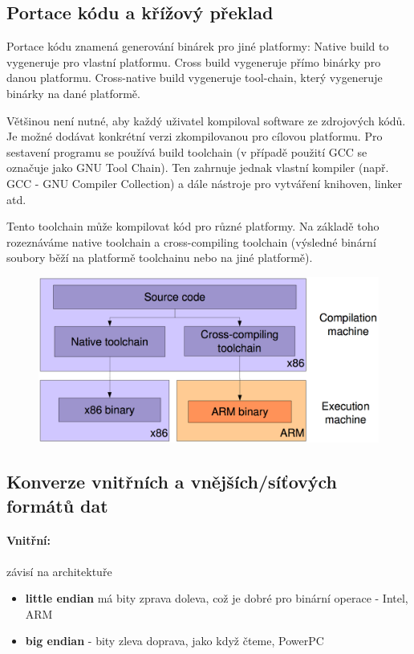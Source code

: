 \subsection{Portace kódu a křížový překlad}
Portace kódu znamená generování binárek pro jiné platformy: Native build to vygeneruje pro vlastní platformu. Cross build vygeneruje přímo binárky pro danou platformu. Cross-native build vygeneruje tool-chain, který vygeneruje binárky na dané platformě.

Většinou není nutné, aby každý uživatel kompiloval software ze zdrojových kódů. Je možné dodávat konkrétní verzi zkompilovanou pro cílovou platformu. Pro sestavení programu se používá build toolchain (v případě použití GCC se označuje jako GNU Tool Chain). Ten zahrnuje jednak vlastní kompiler (např. GCC - GNU Compiler Collection) a dále nástroje pro vytváření knihoven, linker atd.

Tento toolchain může kompilovat kód pro různé platformy. Na základě toho rozeznáváme native toolchain a cross-compiling toolchain (výsledné binární soubory běží na platformě toolchainu nebo na jiné platformě).

\begin{figure}[h!]
\centering
\includegraphics[width=130mm]{08/images/portace-kodu}
\end{figure}

\subsection{Konverze vnitřních a vnějších/síťových formátů dat}

\paragraph{Vnitřní:} závisí na architektuře
\begin{itemize}
\item \textbf{little endian} má bity zprava doleva, což je dobré pro binární operace - Intel, ARM
\item \textbf{big endian} - bity zleva doprava, jako když čteme, PowerPC
\end{itemize}
